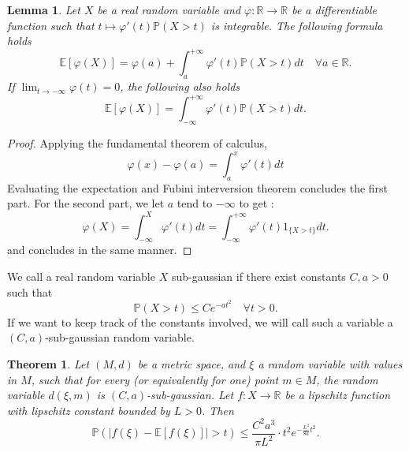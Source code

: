 \documentclass{article}
\newtheorem{theorem}{Theorem}
\newtheorem{lemma}{Lemma}
\begin{document}
\begin{lemma}
Let $X$ be a real random variable and $\varphi : \mathbb R \rightarrow \mathbb R$ be a differentiable function such that $t\mapsto \varphi'(t)\mathbb P(X>t)$ is integrable. The following formula holds
$$\mathbb E [\varphi(X)] = \varphi(a) + \int_{a}^{+\infty} \varphi'(t)\mathbb P(X > t) dt \quad \forall a \in \mathbb R.$$
If $\lim_{t\rightarrow -\infty}\varphi(t) =0$, the following also holds
$$\mathbb E [\varphi(X)] = \int_{-\infty}^{+\infty} \varphi'(t)\mathbb P(X > t) dt.$$
\end{lemma}

\begin{proof}
Applying the fundamental theorem of calculus,
$$\varphi(x)-\varphi(a) = \int_a^x\varphi'(t)dt$$
Evaluating the expectation and Fubini interversion theorem concludes the first part.
For the second part, we let $a$ tend to $-\infty$ to get :
$$\varphi(X) = \int_{-\infty}^X\varphi'(t)dt = \int_{-\infty}^{+\infty} \varphi'(t) 1_{\{X > t\}} dt.$$
and concludes in the same manner.
\end{proof}

We call a real random variable $X$ sub-gaussian if there exist constants $C , a>0$ such that 
$$\mathbb P( X > t ) \leq Ce^{-at^2} \quad \forall t >0.$$ 
If we want to keep track of the constants involved, we will call such a variable a $(C,a)$-sub-gaussian random variable.

\begin{theorem}
Let $(M,d)$ be a metric space, and $\xi$ a random variable with values in $M$, such that for every (or equivalently for one) point $m\in M$, the random variable $d(\xi, m)$ is $(C,a)$-sub-gaussian. Let $f : X\rightarrow \mathbb R$ be a lipschitz function with lipschitz constant bounded by $L>0$. Then  
$$\mathbb P(|f(\xi)  - \mathbb E[f(\xi)]| > t) \leq   \frac{C^2a^3}{\pi L^2} \cdot t^2 e^{-\frac{ L^2}{8a}t^2} .$$
\end{theorem}
\end{document}
